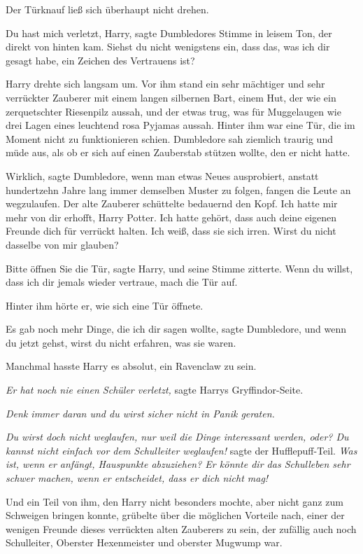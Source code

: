 Der Türknauf ließ sich überhaupt nicht drehen.

\glqq Du hast mich verletzt, Harry\grqq{}, sagte Dumbledores Stimme in leisem
Ton, der direkt von hinten kam. \glqq Siehst du nicht wenigstens ein, dass das,
was ich dir gesagt habe, ein Zeichen des Vertrauens ist?\grqq{}

Harry drehte sich langsam um. Vor ihm stand ein sehr mächtiger und sehr
verrückter Zauberer mit einem langen silbernen Bart, einem Hut, der wie ein
zerquetschter Riesenpilz aussah, und der etwas trug, was für Muggelaugen wie
drei Lagen eines leuchtend rosa Pyjamas aussah. Hinter ihm war eine Tür, die im
Moment nicht zu funktionieren schien. Dumbledore sah ziemlich traurig und müde
aus, als ob er sich auf einen Zauberstab stützen wollte, den er nicht hatte.

\glqq Wirklich\grqq{}, sagte Dumbledore, \glqq wenn man etwas Neues ausprobiert,
anstatt hundertzehn Jahre lang immer demselben Muster zu folgen, fangen die
Leute an wegzulaufen.\grqq{} Der alte Zauberer schüttelte bedauernd den Kopf.
\glqq Ich hatte mir mehr von dir erhofft, Harry Potter. Ich hatte gehört, dass
auch deine eigenen Freunde dich für verrückt halten. Ich weiß, dass sie sich
irren. Wirst du nicht dasselbe von mir glauben?\grqq{}

\glqq Bitte öffnen Sie die Tür\grqq{}, sagte Harry, und seine Stimme zitterte.
\glqq Wenn du willst, dass ich dir jemals wieder vertraue, mach die Tür
auf.\grqq{}

Hinter ihm hörte er, wie sich eine Tür öffnete.

\glqq Es gab noch mehr Dinge, die ich dir sagen wollte\grqq{}, sagte Dumbledore,
\glqq und wenn du jetzt gehst, wirst du nicht erfahren, was sie waren.\grqq{}

Manchmal hasste Harry es absolut, ein Ravenclaw zu sein.

\emph{Er hat noch nie einen Schüler verletzt,} sagte Harrys Gryffindor-Seite.

\emph{Denk immer daran und du wirst sicher nicht in Panik geraten.}

\emph{Du wirst doch nicht weglaufen, nur weil die Dinge interessant werden,
oder? Du kannst nicht einfach vor dem Schulleiter weglaufen!} sagte der
Hufflepuff-Teil. \emph{Was ist, wenn er anfängt, Hauspunkte abzuziehen? Er
könnte dir das Schulleben sehr schwer machen, wenn er entscheidet, dass er dich
nicht mag!}

Und ein Teil von ihm, den Harry nicht besonders mochte, aber nicht ganz zum
Schweigen bringen konnte, grübelte über die möglichen Vorteile nach, einer der
wenigen Freunde dieses verrückten alten Zauberers zu sein, der zufällig auch
noch Schulleiter, Oberster Hexenmeister und oberster Mugwump war.

